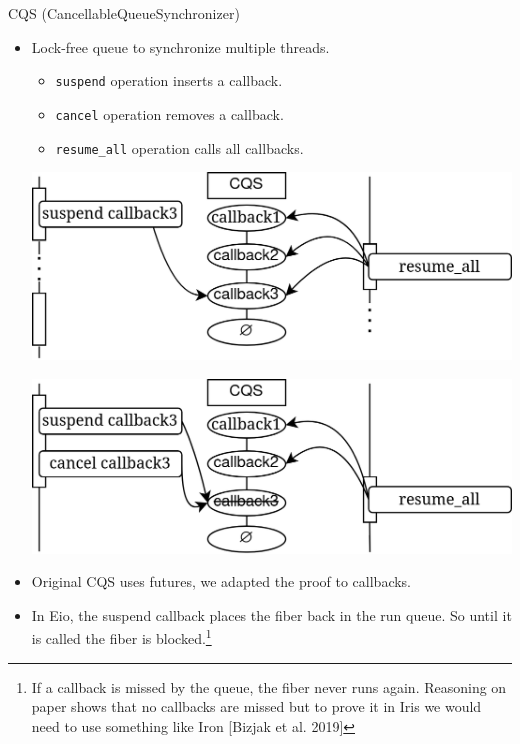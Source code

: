 \documentclass[aspectratio=43]{beamer}
\newcommand{\ocaml}[1]{\texttt{#1}}
\begin{document}
\begin{frame}{CQS (CancellableQueueSynchronizer)}
    \begin{itemize}
        \item Lock-free queue to synchronize multiple threads.
              \begin{itemize}
                  \item \ocaml{suspend} operation inserts a callback.
                  \item \ocaml{cancel} operation removes a callback.
                  \item \ocaml{resume_all} operation calls all callbacks.
              \end{itemize}
              \vspace{0.5em}
              \begin{minipage}{0.45\textwidth}
                  \includegraphics[width=\textwidth]{cqs-resume.png}
              \end{minipage}
              \begin{minipage}{0.45\textwidth}
                  \includegraphics[width=\textwidth]{cqs-cancel.png}
              \end{minipage}
        \item Original CQS uses futures, we adapted the proof to callbacks.
        \item In Eio, the suspend callback places the fiber back in the run queue. So until it is called the fiber is blocked.\footnote{If a callback is missed by the queue, the fiber never runs again. Reasoning on paper shows that no callbacks are missed but to prove it in Iris we would need to use something like Iron [Bizjak et al. 2019]}
    \end{itemize}
\end{frame}
\end{document}
